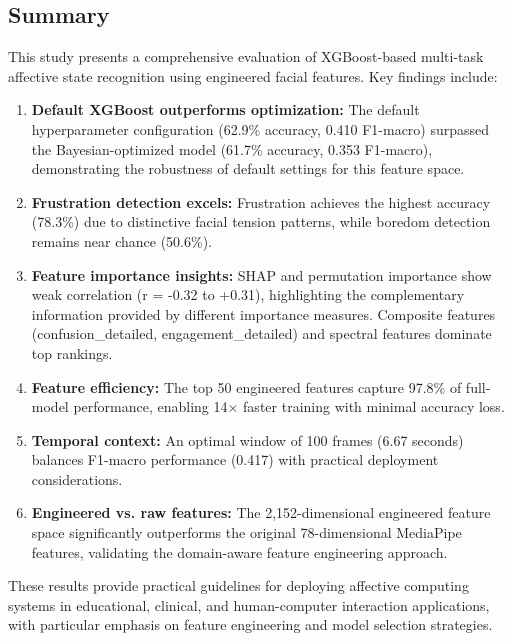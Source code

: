 \subsection{Summary}
\label{sec:summary}

This study presents a comprehensive evaluation of XGBoost-based multi-task affective state recognition using engineered facial features. Key findings include:

\begin{enumerate}
    \item \textbf{Default XGBoost outperforms optimization:} The default hyperparameter configuration (62.9\% accuracy, 0.410 F1-macro) surpassed the Bayesian-optimized model (61.7\% accuracy, 0.353 F1-macro), demonstrating the robustness of default settings for this feature space.

    \item \textbf{Frustration detection excels:} Frustration achieves the highest accuracy (78.3\%) due to distinctive facial tension patterns, while boredom detection remains near chance (50.6\%).

    \item \textbf{Feature importance insights:} SHAP and permutation importance show weak correlation (r = -0.32 to +0.31), highlighting the complementary information provided by different importance measures. Composite features (confusion\_detailed, engagement\_detailed) and spectral features dominate top rankings.

    \item \textbf{Feature efficiency:} The top 50 engineered features capture 97.8\% of full-model performance, enabling 14$\times$ faster training with minimal accuracy loss.

    \item \textbf{Temporal context:} An optimal window of 100 frames (6.67 seconds) balances F1-macro performance (0.417) with practical deployment considerations.

    \item \textbf{Engineered vs. raw features:} The 2,152-dimensional engineered feature space significantly outperforms the original 78-dimensional MediaPipe features, validating the domain-aware feature engineering approach.
\end{enumerate}

These results provide practical guidelines for deploying affective computing systems in educational, clinical, and human-computer interaction applications, with particular emphasis on feature engineering and model selection strategies.